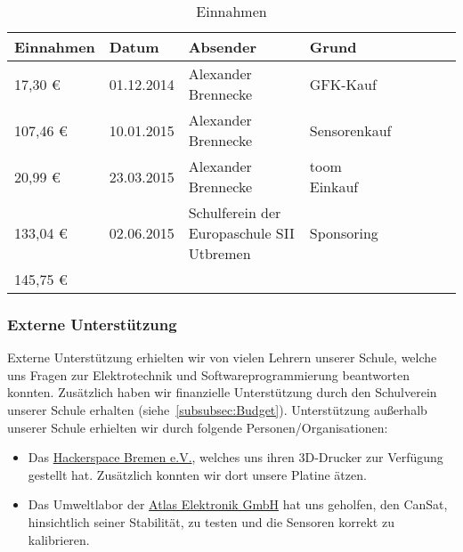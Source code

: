 \begin{table}[htbp]
  \centering
    \begin{tabular}{p{}p{}p{}p{}rrrl}
    \toprule
    \multicolumn{1}{c}{\textbf{Einnahmen}} & \textbf{Datum} & \textbf{Absender} & \textbf{Grund} \\
    \midrule
              17,30 \euro  & 01.12.2014 & Alexander Brennecke & GFK-Kauf \\
           107,46 \euro  & 10.01.2015 & Alexander Brennecke & Sensorenkauf \\
              20,99 \euro  & 23.03.2015 & Alexander Brennecke & toom Einkauf \\
133,04 \euro  & 02.06.2015 & Schulferein der Europaschule SII Utbremen & Sponsoring \\
    \bottomrule
    145,75 \euro & & & \\
    \bottomrule
    \end{tabular}%
	\caption{Einnahmen}
  \label{tab:budgeteinnahmen}%
\end{table}%

\subsubsection{Externe Unterstützung}
Externe Unterstützung erhielten wir von vielen Lehrern unserer Schule, welche uns Fragen zur Elektrotechnik und Softwareprogrammierung beantworten konnten. Zusätzlich haben wir finanzielle Unterstützung durch den Schulverein unserer Schule erhalten (siehe~\ref{subsubsec:Budget}).
Unterstützung außerhalb unserer Schule erhielten wir durch folgende Personen/Organisationen:

\begin{itemize}
	\item Das \href{https://www.hackerspace-bremen.de/}{Hackerspace Bremen e.V.}, welches uns ihren 3D-Drucker zur Verfügung gestellt hat. Zusätzlich konnten wir dort unsere Platine ätzen.
	\begin{comment}
	\item \href{http://de.wikipedia.org/wiki/Martin_Schneider_(Nachrichtentechniker)} {Prof. Martin Schneider} von von dem Hochfrequenzlabor der Universität Bremen, welcher uns geholfen hat unsere Antenne an die Frequenz und die Wellenimpedanz anzupassen.
	\end{comment}
	\item Das Umweltlabor der \href{http://www.atlas-elektronik.com/atlas-elektronik/}{Atlas Elektronik GmbH} hat uns geholfen, den CanSat, hinsichtlich seiner Stabilität, zu testen und die Sensoren korrekt zu kalibrieren.
\end{itemize}